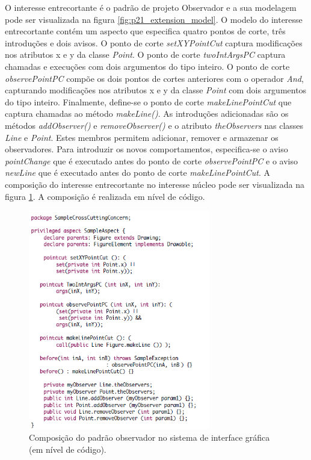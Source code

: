 O interesse entrecortante é o padrão de projeto Observador e a sua modelagem  pode ser visualizada na figura \ref{fig:p21_extension_model}. 
O modelo do interesse entrecortante contém um aspecto que especifica quatro pontos de corte, três introduções e dois avisos. O ponto de corte
\textit{setXYPointCut} captura modificações nos atributos x e y da classe \textit{Point}. O ponto de corte  \textit{twoIntArgsPC} captura chamadas e
execuções com dois argumentos do tipo inteiro. O ponto de corte \textit{observePointPC} compõe os dois pontos de cortes anteriores com o operador \textit{And},
capturando modificações nos atributos x e y da classe \textit{Point} com dois argumentos do tipo inteiro. Finalmente, define-se o ponto de corte 
\textit{makeLinePointCut} que captura chamadas ao método \textit{makeLine()}. As introduções adicionadas são os métodos \textit{addObserver()} e
\textit{removeObserver()} e o atributo \textit{theObservers} nas classes \textit{Line} e \textit{Point}. Estes membros permitem adicionar, remover e
armazenar os observadores. Para introduzir os novos comportamentos, especifica-se o aviso \textit{pointChange} que é executado antes do ponto de
corte \textit{observePointPC} e o aviso \textit{newLine} que é executado antes do ponto de corte \textit{makeLinePointCut}. A composição do interesse
entrecortante no interesse núcleo pode ser visualizada na figura \ref{fig:p21_code}. A composição é realizada em nível de código.

\begin{figure}
	\centering
	\includegraphics[width=300px]{img/p21_code.png}
	\caption{Composição do padrão observador no sistema de
	interface gráfica (em nível de código).}\label{fig:p21_code}
\end{figure}

